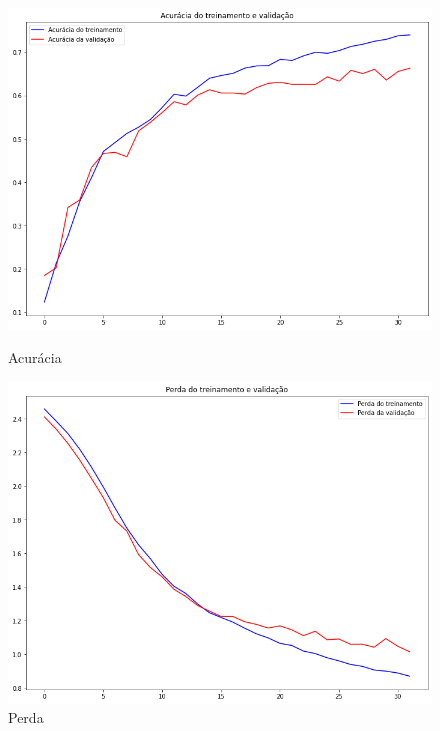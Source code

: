 \documentclass[12pt]{article}
\begin{document}
\begin{figure}[!htb]
  \begin{minipage}{.47\textwidth}
    \centering
    \includegraphics[width=1.1\linewidth]{experiments/lenet5_noaug_32/accuracy.png}
    \caption{Acurácia}\label{fig:experiment_lenet5_noaug_32_accuracy}
  \end{minipage}\hfill
  \begin{minipage}{.47\textwidth}
    \centering
    \includegraphics[width=1.1\linewidth]{experiments/lenet5_noaug_32/loss.png}
    \caption{Perda}\label{fig:experiment_lenet5_noaug_32_loss}
  \end{minipage}
\end{figure}
\end{document}
